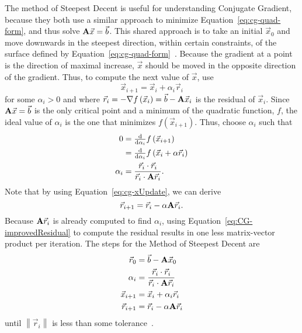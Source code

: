 The method of Steepest Decent is useful for understanding Conjugate Gradient, because they both use a similar approach to minimize Equation~\ref{eq:cg-quad-form}, and thus solve \(\mathbf{A}\vec{x}=\vec{b}\).
This shared approach is to take an initial \(\vec{x}_0\) and move downwards in the steepest direction, within certain constraints, of the surface defined by Equation~\ref{eq:cg-quad-form}~\cite{Nearing:2010:toolsForPhysics}.
Because the gradient at a point is the direction of maximal increase, \(\vec{x}\) should be moved in the opposite direction of the gradient.
Thus, to compute the next value of \(\vec{x}\), use
\begin{equation}
\label{eq:cg-xUpdate}
	\vec{x}_{i+1} = \vec{x}_i + \alpha_i \vec{r}_i
\end{equation}
for some \(\alpha_i > 0\) and where \(\vec{r}_i = -\nabla f\left(\vec{x}_i\right) = \vec{b} - \mathbf{A}\vec{x}_i\) is the residual of \(\vec{x}_i\).
Since \(\mathbf{A}\vec{x} = \vec{b}\) is the only critical point and a minimum of the quadratic function, \(f\), the ideal value of \(\alpha_i\) is the one that minimizes \(f\left(\vec{x}_{i+1}\right)\).
Thus, choose \(\alpha_i\) such that
\begin{align*}
	0
	&= \tfrac{\mathrm{d}}{\mathrm{d} \alpha_i} f\left(\vec{x}_{i+1}\right) \\
	&= \tfrac{\mathrm{d}}{\mathrm{d} \alpha_i} f\left(\vec{x}_i + \alpha \vec{r}_i\right) \\
%
	\alpha_i
	&= \frac{\vec{r}_i\cdot \vec{r}_i}{\vec{r}_i\cdot\mat{A}\vec{r}_i}.
\end{align*}
Note that by using Equation~\ref{eq:cg-xUpdate}, we can derive
\begin{equation}
\label{eq:CG-improvedResidual}
	\vec{r}_{i+1} = \vec{r}_i - \alpha\mathbf{A}\vec{r}_i.
\end{equation}
Because \(\mathbf{A}\vec{r}_i\) is already computed to find \(\alpha_i\), using Equation~\ref{eq:CG-improvedResidual} to compute the residual results in one less matrix-vector product per iteration.
The steps for the Method of Steepest Decent are
\begin{align*}
	\vec{r}_0 &= \vec{b} - \mathbf{A}\vec{x}_0 \\
	\alpha_i &= \frac{\vec{r}_i\cdot \vec{r}_i}{\vec{r}_i\cdot\mathbf{A}\vec{r}_i}\\
	\vec{x}_{i+1} &= \vec{x}_i + \alpha_i\vec{r}_i\\
	\vec{r}_{i+1} &= \vec{r}_i - \alpha\mathbf{A}\vec{r}_i
\end{align*}
until \(\left\|\vec{r}_i\right\|\) is less than some tolerance~\cite{Shewchuk:1994:IntroToCG}.


